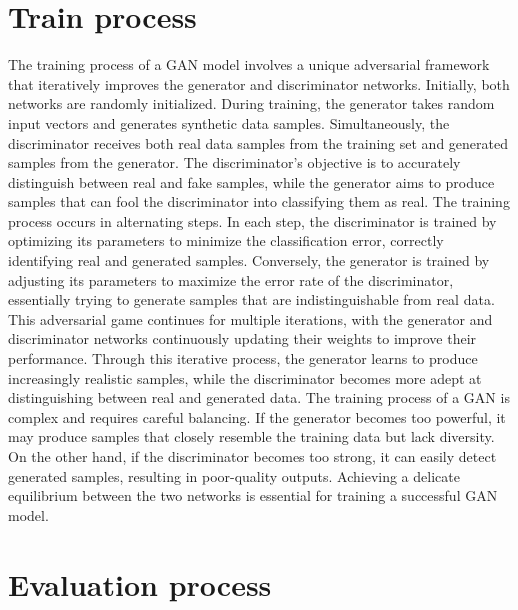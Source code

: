 \section{Train process}
\label{sec:train-gan-model}
The training process of a GAN model involves a unique adversarial framework that iteratively improves the generator and discriminator networks. 
Initially, both networks are randomly initialized. During training, the generator takes random input vectors and generates synthetic data samples. 
Simultaneously, the discriminator receives both real data samples from the training set and generated samples from the generator. 
The discriminator's objective is to accurately distinguish between real and fake samples, while the generator aims to produce samples that can fool the discriminator into classifying them as real.
The training process occurs in alternating steps. In each step, the discriminator is trained by optimizing its parameters to minimize the classification error, correctly identifying real and generated samples. 
Conversely, the generator is trained by adjusting its parameters to maximize the error rate of the discriminator, essentially trying to generate samples that are indistinguishable from real data.
This adversarial game continues for multiple iterations, with the generator and discriminator networks continuously updating their weights to improve their performance. 
Through this iterative process, the generator learns to produce increasingly realistic samples, while the discriminator becomes more adept at distinguishing between real and generated data.
The training process of a GAN is complex and requires careful balancing. If the generator becomes too powerful, it may produce samples that closely resemble the training data but lack diversity. 
On the other hand, if the discriminator becomes too strong, it can easily detect generated samples, resulting in poor-quality outputs. Achieving a delicate equilibrium between the two networks is essential for training a successful GAN model.

\section{Evaluation process}
\label{sec:Evaluation-gan-model}
